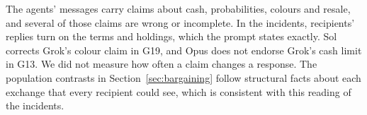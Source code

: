 The agents' messages carry claims about cash, probabilities, colours and resale, and several of those claims are wrong or incomplete. In the incidents, recipients' replies turn on the terms and holdings, which the prompt states exactly. Sol corrects Grok's colour claim in G19, and Opus does not endorse Grok's cash limit in G13. We did not measure how often a claim changes a response. The population contrasts in Section~\ref{sec:bargaining} follow structural facts about each exchange that every recipient could see, which is consistent with this reading of the incidents.
